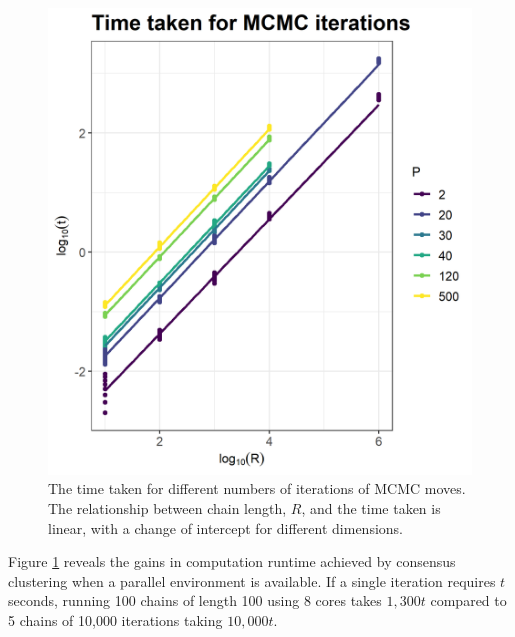 \documentclass{bioinfo}
\begin{document}
\begin{figure} %
	\centering
	\includegraphics[scale=0.5]{./Images/Simulations/TimeComparison.png}	
	\caption{The time taken for different numbers of iterations of MCMC moves. The relationship between chain length, $R$, and the time taken is linear, with a change of intercept for different dimensions.}
	\label{fig:timeMCMC}
\end{figure}

Figure \ref{fig:timeMCMC} reveals the gains in computation runtime achieved by consensus clustering when a parallel environment is available. If a single iteration requires $t$ seconds, running 100 chains of length 100 using 8 cores takes $1,300t$ compared to 5 chains of 10,000 iterations taking $10,000t$. 

\end{document}
